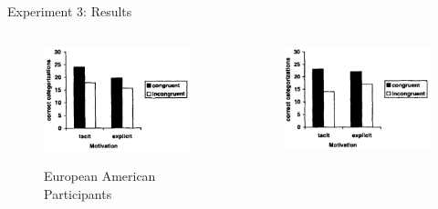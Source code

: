     \begin{frame}{Experiment 3: Results}
        \begin{columns}

            \begin{column}{0.45\textwidth}
                \begin{figure}
                \centering
                \includegraphics[height = 0.48 \textheight]{images/result3_euro.png}
                
                {\footnotesize European American Participants}
                \end{figure}
            \end{column}
            
            \begin{column}{0.45\textwidth}
                \begin{figure}
                    \centering
                    \includegraphics[height = 0.48 \textheight]{images/result3_asia.png}
                    

\end{figure}
\end{column}
\end{columns}
\end{frame}

